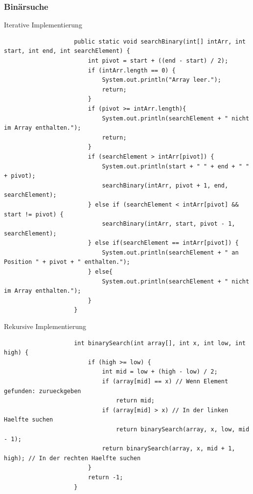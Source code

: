 \documentclass[a4paper, landscape, 8pt]{scrartcl}
\begin{document}
\begin{multicols*}{4}
                \subsubsection{Binärsuche}
                \textcolor{subsectioncolor}{Iterative Implementierung}
                \begin{lstlisting}
                    public static void searchBinary(int[] intArr, int start, int end, int searchElement) {
                        int pivot = start + ((end - start) / 2);
                        if (intArr.length == 0) {
                            System.out.println("Array leer.");
                            return;
                        }
                        if (pivot >= intArr.length){
                            System.out.println(searchElement + " nicht im Array enthalten.");
                            return;
                        }
                        if (searchElement > intArr[pivot]) {
                            System.out.println(start + " " + end + " " + pivot);
                            searchBinary(intArr, pivot + 1, end, searchElement);
                        } else if (searchElement < intArr[pivot] && start != pivot) {
                            searchBinary(intArr, start, pivot - 1, searchElement);
                        } else if(searchElement == intArr[pivot]) {
                            System.out.println(searchElement + " an Position " + pivot + " enthalten.");
                        } else{
                            System.out.println(searchElement + " nicht im Array enthalten.");
                        }
                    }
                \end{lstlisting}
                \textcolor{subsectioncolor}{Rekursive Implementierung}
                \begin{lstlisting}
                    int binarySearch(int array[], int x, int low, int high) {
                        if (high >= low) {
                            int mid = low + (high - low) / 2;
                            if (array[mid] == x) // Wenn Element gefunden: zurueckgeben
                                return mid;
                            if (array[mid] > x) // In der linken Haelfte suchen
                                return binarySearch(array, x, low, mid - 1);
                            return binarySearch(array, x, mid + 1, high); // In der rechten Haelfte suchen
                        }
                        return -1;
                    }
                \end{lstlisting}


\end{multicols*}
\end{document}
